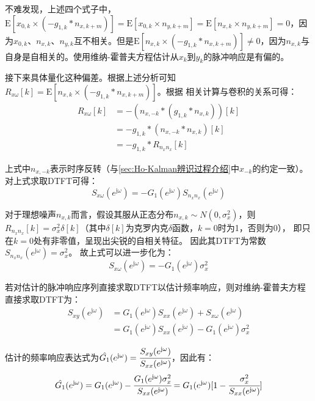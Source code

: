 不难发现，上述四个式子中，\(\text{E}[x_{0,k}\times(-g_{1,k}*n_{x,k+m})]=\text{E}[x_{0,k}\times n_{y,k+m}]=
\text{E}[n_{x,k}\times n_{y,k+m}]=0\)，因为\(x_{0,k}\)、\(n_{x,k}\)、\(n_{y,k}\)互不相关。但是\(\text{E}[n_{x,k}\times(-g_{1,k}*n_{x,k+m})]
\neq 0\)，因为\(n_{x,k}\)与自身是自相关的。使用维纳-霍普夫方程估计从\(x_k\)到\(y_k\)的脉冲响应是有偏的。

接下来具体量化这种偏差。根据上述分析可知\(R_{x\omega}[k]=\text{E}[n_{x,k}\times(-g_{1,k}*n_{x,k+m})]\)。根据
相关计算与卷积的关系可得：
\begin{align*}
    R_{x\omega}[k]&=-(n_{x,-k}*(g_{1,k}*n_{x,k}))[k]\\
    &=-g_{1,k} * (n_{x,-k}*n_{x,k})[k]\\
    &=-g_{1,k}*R_{n_xn_x}[k]
\end{align*}

上式中\(n_{x,-k}\)表示时序反转（与\ref{sec:Ho-Kalman辨识过程介绍}中\(x_{-k}\)的约定一致）。对上式求取DTFT可得：
\begin{equation*}
    S_{x\omega}(e^{\mathrm{j}\omega})=-G_1(e^{\mathrm{j}\omega})S_{n_xn_x}(e^{\mathrm{j}\omega})
\end{equation*}

对于理想噪声\(n_{x,k}\)而言，假设其服从正态分布\(n_{x,k}\sim N(0,\sigma_x^2)\)，则
\(R_{n_xn_x}[k]=\sigma_x^2\delta[k]\)（其中\(\delta[k]\)为克罗内克\(\delta\)函数，\(k=0\)时为1，否则为0），
即只在\(k=0\)处有非零值，呈现出尖锐的自相关特征。
因此其DTFT为常数\(S_{n_xn_x}(e^{\mathrm{j}\omega})=\sigma_x^2\)。
故上式可以进一步化为：
\begin{equation*}
    S_{x\omega}(e^{\mathrm{j}\omega})=-G_1(e^{\mathrm{j}\omega})\sigma_x^2
\end{equation*}

若对估计的脉冲响应序列直接求取DTFT以估计频率响应，则对维纳-霍普夫方程直接求取DTFT为：
\begin{align*}
    S_{xy}(e^{\mathrm{j}\omega})&=G_1(e^{\mathrm{j}\omega})S_{xx}(e^{\mathrm{j}\omega})+S_{x\omega}(e^{\mathrm{j}\omega})\\
    &=G_1(e^{\mathrm{j}\omega})S_{xx}(e^{\mathrm{j}\omega})-G_1(e^{\mathrm{j}\omega})\sigma_x^2
\end{align*}

估计的频率响应表达式为\(\hat{G_1}(e^{\mathrm{j}\omega})=\cfrac{S_{xy}(e^{\mathrm{j}\omega})}{S_{xx}(e^{\mathrm{j}\omega})}\)，因此有：
\begin{equation}
    \hat{G_1}(e^{\mathrm{j}\omega})=G_1(e^{\mathrm{j}\omega})-\cfrac{G_1(e^{\mathrm{j}\omega})\sigma_x^2}{S_{xx}(e^{\mathrm{j}\omega})}
    =G_1(e^{\mathrm{j}\omega})[1-\cfrac{\sigma_x^2}{S_{xx}(e^{\mathrm{j}\omega})}]
    \label{eq:闭环有偏性公式}
\end{equation}

